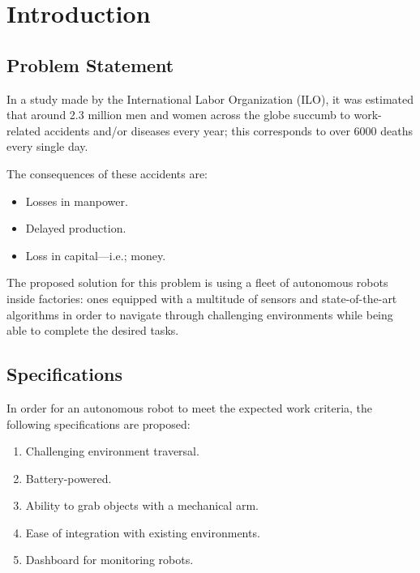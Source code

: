 \setcounter{page}{1}			%
\pagestyle{scrheadings}			%




\chapter{Introduction}
\label{ch:1}
\section{Problem Statement}

In a study made by the International Labor Organization (ILO), it was estimated that around 2.3 million men and women across the globe succumb to work-related accidents and/or diseases every year; this corresponds to over 6000 deaths every single day. 

The consequences of these accidents are:
\begin{itemize}
	\item Losses in manpower.

	\item Delayed production.

	\item Loss in capital---i.e.; money.
\end{itemize}

The proposed solution for this problem is using a fleet of autonomous robots inside factories: ones equipped with a multitude of sensors and state-of-the-art algorithms in order to navigate through challenging environments while being able to complete the desired tasks.

\section{Specifications}

In order for an autonomous robot to meet the expected work criteria, the following specifications are proposed:
\begin{enumerate}
	\item Challenging environment traversal.

	\item Battery-powered.

	\item Ability to grab objects with a mechanical arm.

    \item Ease of integration with existing environments.

    \item Dashboard for monitoring robots.
\end{enumerate}

